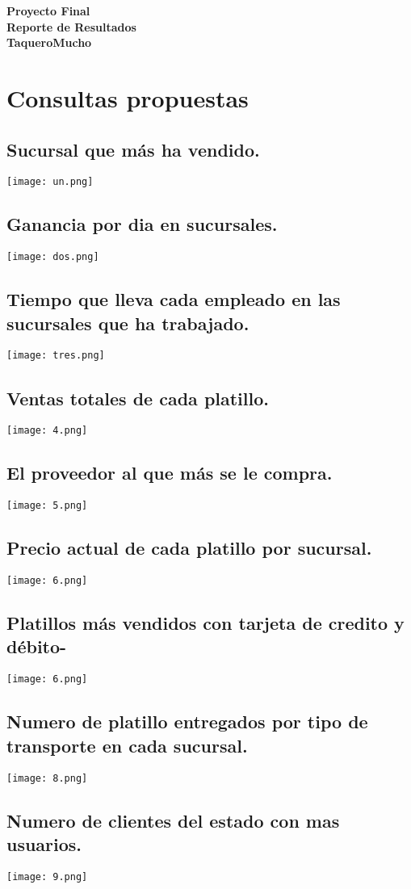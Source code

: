 \documentclass[11pt]{article}
\begin{document}
\begin{center}
	\LARGE{\textbf{Proyecto Final\\Reporte de Resultados\\TaqueroMucho}}
\end{center}

\section{Consultas propuestas }
\subsection{Sucursal que más ha vendido.}
\texttt{[image: un.png]}
\subsection{Ganancia por dia en sucursales.}
\texttt{[image: dos.png]}
\subsection{Tiempo que lleva cada empleado en las sucursales que ha trabajado.}
\texttt{[image: tres.png]}
\subsection{Ventas totales de cada platillo.}
\texttt{[image: 4.png]}
\subsection{El proveedor al que más se le compra.}
\texttt{[image: 5.png]}
\subsection{Precio actual de cada platillo por sucursal.}
\texttt{[image: 6.png]}
\subsection{Platillos más vendidos con tarjeta de credito y débito-}
\texttt{[image: 6.png]}
\subsection{Numero de platillo entregados por tipo de transporte en cada sucursal.}
\texttt{[image: 8.png]}
\subsection{Numero de clientes del estado con mas usuarios.}
\texttt{[image: 9.png]}
\end{document}
